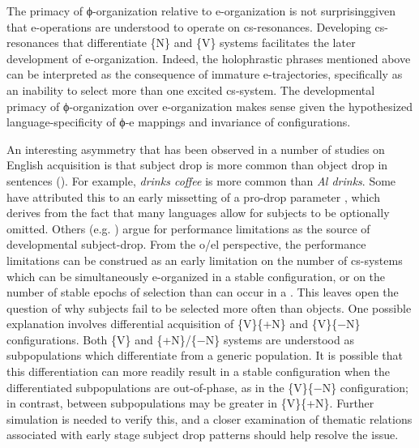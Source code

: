The primacy of ϕ-organization relative to e-organization is not surprising\linebreak given that e-operations are understood to operate on cs-res\-o\-nances. Developing cs-res\-o\-nances that differentiate \{N\} and \{V\} systems facilitates the later development of e-organization. Indeed, the holophrastic phrases mentioned above can be interpreted as the consequence of immature e-trajectories, specifically as an inability to select more than one excited cs-system. The developmental primacy of ϕ{}-organization over e-organization makes sense given the hypothesized language-specificity of ϕ{}-e mappings and invariance of  configurations.

  An interesting asymmetry that has been observed in a number of studies on English acquisition is that subject drop is more common than object drop in  sentences (\citealt{PBloom1990,Valian1991}). For example, \textit{drinks coffee} is more common than \textit{Al drinks}. Some have attributed this to an early missetting of a pro-drop parameter \citep{Hyams2012}, which derives from the fact that many languages allow for subjects to be optionally omitted. Others (e.g. \citealt{PBloom1990}) argue for performance limitations as the source of developmental subject-drop. From the o/el perspective, the performance limitations can be construed as an early limitation on the number of cs-systems which can be simultaneously e-organized in a stable configuration, or on the number of stable epochs of selection than can occur in a . This leaves open the question of why  subjects fail to be selected more often than objects. One possible explanation involves differential acquisition of \{V\}\{+N\} and \{V\}\{−N\} configurations. Both \{V\} and \{+N\}/\{−N\} systems are understood as subpopulations which differentiate from a generic  population. It is possible that this differentiation can more readily result in a stable configuration when the differentiated subpopulations are out-of-phase, as in the \{V\}\{−N\} configuration; in contrast,  between subpopulations may be greater in \{V\}\{+N\}. Further simulation is needed to verify this, and a closer examination of thematic relations associated with early stage subject drop patterns should help resolve the issue.

